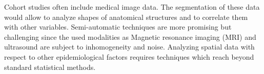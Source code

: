 \documentclass[journal]{style/vgtc} 			          %
\begin{document}
%
Cohort studies often include medical image data.
%
The segmentation of these data would allow to analyze shapes of anatomical structures and to correlate them with other variables.
%
%
%
Semi-automatic techniques are more promising but challenging since the used modalities as Magnetic resonance imaging (MRI) and ultrasound are subject to inhomogeneity and noise.
%
Analyzing spatial data with respect to other epidemiological factors requires techniques which reach beyond standard statistical methods.
\end{document}
